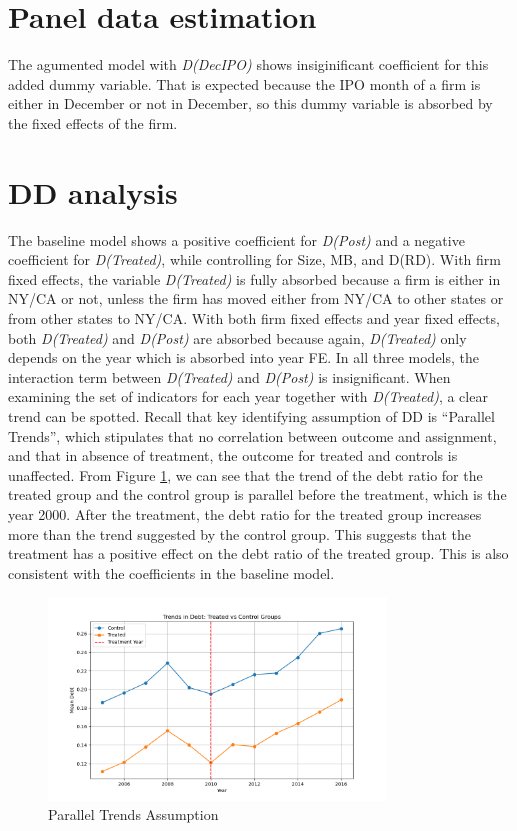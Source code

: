 \documentclass[12pt, times]{article}
\begin{document}
\section*{Panel data estimation}
The agumented model with \textit{D(DecIPO)} shows insiginificant coefficient for this added dummy variable.
That is expected because the IPO month of a firm is either in December or not in December, so 
this dummy variable is absorbed by the fixed effects of the firm.

\section*{DD analysis}
The baseline model shows a positive coefficient for \textit{D(Post)} and a negative coefficient for 
\textit{D(Treated)}, while controlling for Size, MB, and D(RD). With firm fixed effects, the variable \textit{D(Treated)} is fully
absorbed because a firm is either in NY/CA or not, unless the firm has moved either from NY/CA to other states or
from other states to NY/CA. With both firm fixed effects and year fixed effects, both \textit{D(Treated)} and \textit{D(Post)} are absorbed
because again, \textit{D(Treated)} only depends on the year which is absorbed into year FE. In all three models, the interaction
term between \textit{D(Treated)} and \textit{D(Post)} is insignificant.
When examining the set of indicators for each year together with \textit{D(Treated)}, a clear trend can be spotted. 
Recall that key identifying assumption of DD is “Parallel Trends”, which stipulates that no correlation between outcome 
and assignment, and that in absence of treatment, the outcome for treated and controls is unaffected.
From Figure \ref{fig:parallel_trends}, we can see that the trend of the debt ratio for the treated group and the control group
is parallel before the treatment, which is the year 2000. After the treatment, the debt ratio for the treated group increases more than the trend
suggested by the control group. This suggests that the treatment has a positive effect on the debt ratio of the treated group.
This is also consistent with the coefficients in the baseline model.

\begin{figure}[h!]
    \centering
    \includegraphics[width=0.8\textwidth]{parallel_trends.png}
    \caption{Parallel Trends Assumption}
    \label{fig:parallel_trends}
\end{figure}
\end{document}
